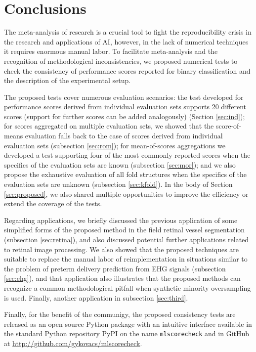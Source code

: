 \documentclass[5p, final]{elsarticle}
\begin{document}
\section{Conclusions}
\label{sec:conclusions}

The meta-analysis of research is a crucial tool to fight the reproducibility crisis in the research and applications of AI, however, in the lack of numerical techniques it requires enormous manual labor. To facilitate meta-analysis and the recognition of methodological inconsistencies, we proposed numerical tests to check the consistency of performance scores reported for binary classification and the description of the experimental setup.

The proposed tests cover numerous evaluation scenarios: the test developed for performance scores derived from individual evaluation sets supports 20 different scores (support for further scores can be added analogously) (Section \ref{sec:ind}); for scores aggregated on multiple evaluation sets, we showed that the score-of-means evaluation falls back to the case of scores derived from individual evaluation sets (subsection \ref{sec:rom}); for mean-of-scores aggregations we developed a test supporting four of the most commonly reported scores when the specifics of the evaluation sets are known (subsection \ref{sec:mor}); and we also propose the exhaustive evaluation of all fold structures when the specifics of the evaluation sets are unknown (subsection \ref{sec:kfold}). In the body of Section \ref{sec:proposed}, we also shared multiple opportunities to improve the efficiency or extend the coverage of the tests.

Regarding applications, we briefly discussed the previous application of some simplified forms of the proposed method in the field retinal vessel segmentation (subsection \ref{sec:retina}), and also discussed potential further applications related to retinal image processing. We also showed that the proposed techniques are suitable to replace the manual labor of reimplementation in situations similar to the problem of preterm delivery prediction from EHG signals (subsection \ref{sec:ehg}), and that application also illustrates that the proposed methods can recognize a common methodological pitfall when synthetic minority oversampling is used. Finally, another application in subsection \ref{sec:third}.

Finally, for the benefit of the communigy, the proposed consistency tests are released as an open source Python package with an intuitive interface available in the standard Python repository PyPI on the name \verb|mlscorecheck| and in GitHub at \url{http://github.com/gykovacs/mlscorecheck}.
\end{document}
